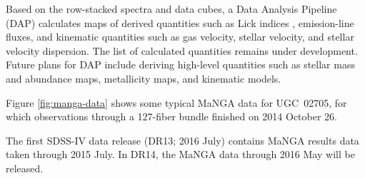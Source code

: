 Based on the row-stacked spectra and data cubes, a Data Analysis
Pipeline (DAP) calculates maps of derived quantities such as Lick
indices \citep[e.g.,][]{worthey94}, emission-line fluxes, and
kinematic quantities such as gas velocity, stellar velocity, and
stellar velocity dispersion. The list of calculated quantities remains
under development.  Future plans for DAP include deriving high-level
quantities such as stellar mass and abundance maps, metallicity maps,
and kinematic models.

Figure \ref{fig:manga-data} shows some typical MaNGA data for
UGC~02705, for which observations through a 127-fiber bundle finished
on 2014 October 26.

The first SDSS-IV data release (DR13; 2016 July) contains MaNGA
results data taken through 2015 July.  In DR14, the MaNGA data through
2016 May will be released.

